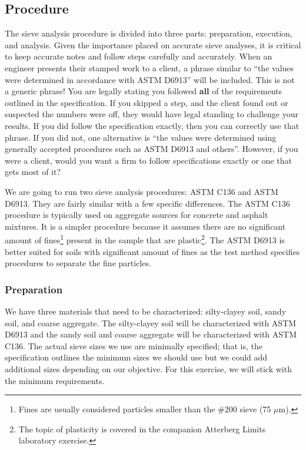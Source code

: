 \documentclass[12pt]{article}
\begin{document}
\pagebreak
\subsection{Procedure}
The sieve analysis procedure is divided into three parts: preparation, execution, and analysis. Given the importance placed on accurate sieve analyses, it is critical to keep accurate notes and follow steps carefully and accurately. When an engineer presents their stamped work to a client, a phrase similar to ``the values were determined in accordance with ASTM D6913'' will be included. This is not a generic phrase! You are legally stating you followed \textbf{all} of the requirements outlined in the specification. If you skipped a step, and the client found out or suspected the numbers were off, they would have legal standing to challenge your results. If you did follow the specification exactly, then you can correctly use that phrase. If you did not, one alternative is ``the values were determined using generally accepted procedures such as ASTM D6913 and others''. However, if you were a client, would you want a firm to follow specifications exactly or one that gets most of it?

We are going to run two sieve analysis procedures: ASTM C136 and ASTM D6913. They are fairly similar with a few specific differences. The ASTM C136 procedure is typically used on aggregate sources for concrete and asphalt mixtures. It is a simpler procedure because it assumes there are no significant amount of fines\footnote{Fines are usually considered particles smaller than the \#200 sieve (75 $\mu$m).} present in the sample that are plastic\footnote{The topic of plasticity is covered in the companion Atterberg Limits laboratory exercise.}. The ASTM D6913 is better suited for soils with significant amount of fines as the test method specifies procedures to separate the fine particles.

\subsubsection{Preparation}
We have three materials that need to be characterized: silty-clayey soil, sandy soil, and coarse aggregate. The silty-clayey soil will be characterized with ASTM D6913 and the sandy soil and coarse aggregate will be characterized with ASTM C136. The actual sieve sizes we use are minimally specified; that is, the specification outlines the minimum sizes we should use but we could add additional sizes depending on our objective. For this exercise, we will stick with the minimum requirements.
\end{document}
